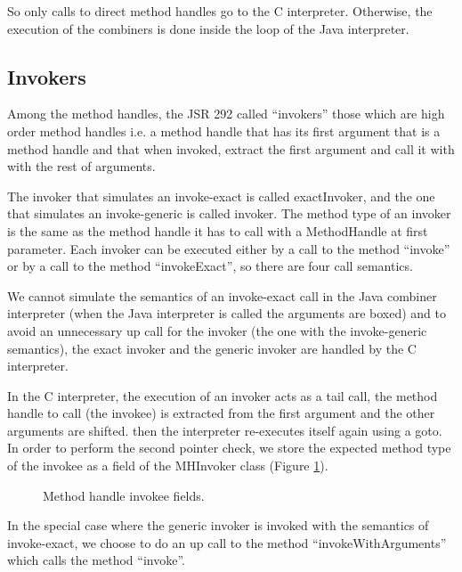 \documentclass{sig-alternate}
\def \Jsr{JSR\xspace}
\def \JSR{\Jsr 292\xspace}
\begin{document}
      So only calls to direct method handles go to the C interpreter.
      Otherwise, the execution of the combiners is done inside the loop of the Java interpreter.

    \subsection{Invokers}
     \label{invokers}

      Among the method handles, the \JSR called ``invokers'' those which are high order method handles i.e.
      a method handle that has its first argument that is a method handle and that when invoked,
      extract the first argument and call it with with the rest of arguments.

      The invoker that simulates an invoke-exact is called exactInvoker, and the one that simulates
      an invoke-generic is called invoker. The method type of an invoker is the same as the method handle
      it has to call with a MethodHandle at first parameter.
      Each invoker can be executed either by a call to the method ``invoke'' or by a call to the method ``invokeExact'',
      so there are four call semantics.
      
      We cannot simulate the semantics of an invoke-exact call in the Java combiner interpreter
      (when the Java interpreter is called the arguments are boxed) and to avoid an unnecessary up call
      for the invoker (the one with the invoke-generic semantics), the exact invoker and the generic invoker
      are handled by the C interpreter.
      
      In the C interpreter, the execution of an invoker acts as a tail call,
      the method handle to call (the invokee) is extracted from the first argument and the other arguments are shifted.
      then the interpreter re-executes itself again using a goto.
      In order to perform the second pointer check, we store the expected method type of the invokee as a field of the MHInvoker class
      (Figure \ref{invokeeFields}).

      \begin{figure}[!h]
        \centering \vspace{-1.5em}
        \caption{Method handle invokee fields.}
        \label{invokeeFields}
      \end{figure}

      In the special case where the generic invoker is invoked with the semantics of invoke-exact,
      we choose to do an up call to the method ``invokeWithArguments'' which calls the method ``invoke''.
\end{document}

